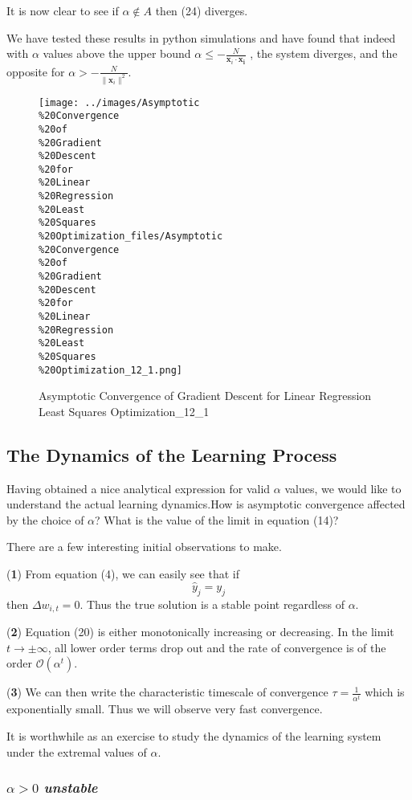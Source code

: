 \documentclass[]{article}
\begin{document}
It is now clear to see if \(\alpha \not\in A\) then (24) diverges.

We have tested these results in python simulations and have found that
indeed with \(\alpha\) values above the upper bound
\(\alpha \le -\frac{N}{\mathbf{x}_i\cdot\mathbf{x_i}}\) , the system
diverges, and the opposite for
\(\alpha > -\frac{N}{\| \mathbf{x}_i\|^2}\).

\begin{figure}[htbp]
\centering
\texttt{[image: ../images/Asymptotic\\\%20Convergence\\\%20of\\\%20Gradient\\\%20Descent\\\%20for\\\%20Linear\\\%20Regression\\\%20Least\\\%20Squares\\\%20Optimization\_files/Asymptotic\\\%20Convergence\\\%20of\\\%20Gradient\\\%20Descent\\\%20for\\\%20Linear\\\%20Regression\\\%20Least\\\%20Squares\\\%20Optimization\_12\_1.png]}
\caption{Asymptotic Convergence of Gradient Descent for Linear
Regression Least Squares Optimization\_12\_1}
\end{figure}

\subsection{The Dynamics of the Learning Process}\label{the-dynamics-of-the-learning-process}

Having obtained a nice analytical expression for valid \(\alpha\)
values, we would like to understand the actual learning dynamics.How is
asymptotic convergence affected by the choice of \(\alpha\)? What is the
value of the limit in equation (14)?

There are a few interesting initial observations to make.

(\textbf{1}) From equation (4), we can easily see that if
\[\hat{y}_j=y_j\] then \(\Delta w_{i,t}=0\). Thus the true solution is a
stable point regardless of \(\alpha\).

(\textbf{2}) Equation (20) is either monotonically increasing or
decreasing. In the limit \(t \to \pm\infty\), all lower order terms drop
out and the rate of convergence is of the order
\(\mathcal{O}(\alpha^t)\).

(\textbf{3}) We can then write the characteristic timescale of
convergence \(\tau = \frac{1}{\alpha^t}\) which is exponentially small.
Thus we will observe very fast convergence.

It is worthwhile as an exercise to study the dynamics of the learning
system under the extremal values of \(\alpha\).

\subsubsection{\(\alpha> 0\) \emph{unstable}}
\end{document}
